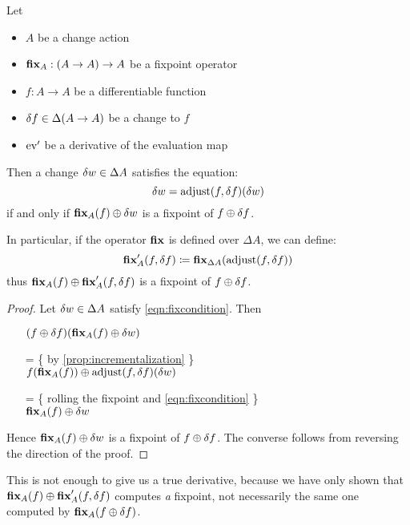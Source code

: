 \begin{thm}
\label{thm:fixpointDiff}
  Let 
  \begin{itemize}
    \item $A$ be a change action
    \item$\textbf{fix}_A : (A \rightarrow A) \rightarrow A$ be a fixpoint operator
    \item $f: A \rightarrow A$ be a differentiable function
    \item $\delta f \in \Delta (A \rightarrow A)$ be a change to $f$
    \item $\operatorname{ev}'$ be a derivative of the evaluation map
  \end{itemize}

  Then a change $\delta w \in \Delta A$ satisfies
  the equation:
  \begin{equation}\label{eqn:fixcondition}
    \delta w = \operatorname{adjust}(f, \delta f)(\delta w)
  \end{equation}
  if and only if $\textbf{fix}_A(f) \oplus \delta w$ is a fixpoint of $f \oplus \delta f$.
  
  In particular, if the operator $\textbf{fix}$ is defined over $\Delta A$, we can define:
  $$
  \textbf{fix}_A'(f, \delta f) \coloneqq
  \textbf{fix}_{\Delta A}(\operatorname{adjust}(f, \delta f))
  $$
  thus $\textbf{fix}_A(f) \oplus \textbf{fix}_A'(f, \delta f)$ is a fixpoint 
  of $f \oplus \delta f$.
\end{thm}
\ifproofs
\begin{proof}
  Let $\delta w \in \Delta A$ satisfy \cref{eqn:fixcondition}. Then
  \begin{itemize}
  \item[ ]
    $
    (f \oplus \delta f)(\textbf{fix}_A(f) \oplus \delta w)
    $
  \item[=]\{ by \cref{prop:incrementalization} \}\\
    $
    f(\textbf{fix}_A(f))
    \oplus
    \operatorname{adjust}(f, \delta f)(\delta w)
    $
  \item[=]\{ rolling the fixpoint and \cref{eqn:fixcondition} \}\\
    $
    \textbf{fix}_A(f)
    \oplus
    \delta w
    $
  \end{itemize}
  Hence $\textbf{fix}_A(f) \oplus \delta w$ is a fixpoint of $f \oplus \delta f$. The converse
  follows from reversing the direction of the proof.
\end{proof}
\fi

This is not enough to give us a true derivative, because we have only shown 
that $\textbf{fix}_A(f) \oplus \textbf{fix}_A'(f, \delta f)$ computes \emph{a} fixpoint, not necessarily
the same one computed by $\textbf{fix}_A{(f \oplus \delta f)}$.

